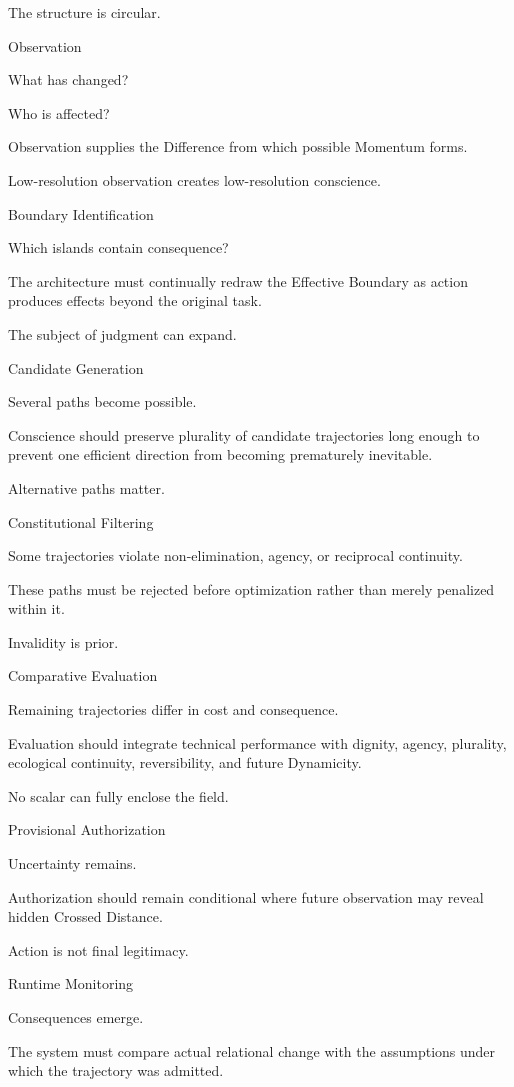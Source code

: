 The structure is circular.

Observation

What has changed?

Who is affected?

Observation supplies the Difference from which possible Momentum forms.

Low-resolution observation creates low-resolution conscience.

Boundary Identification

Which islands contain consequence?

The architecture must continually redraw the Effective Boundary as action produces effects beyond the original task.

The subject of judgment can expand.

Candidate Generation

Several paths become possible.

Conscience should preserve plurality of candidate trajectories long enough to prevent one efficient direction from becoming prematurely inevitable.

Alternative paths matter.

Constitutional Filtering

Some trajectories violate non-elimination, agency, or reciprocal continuity.

These paths must be rejected before optimization rather than merely penalized within it.

Invalidity is prior.

Comparative Evaluation

Remaining trajectories differ in cost and consequence.

Evaluation should integrate technical performance with dignity, agency, plurality, ecological continuity, reversibility, and future Dynamicity.

No scalar can fully enclose the field.

Provisional Authorization

Uncertainty remains.

Authorization should remain conditional where future observation may reveal hidden Crossed Distance.

Action is not final legitimacy.

Runtime Monitoring

Consequences emerge.

The system must compare actual relational change with the assumptions under which the trajectory was admitted.

